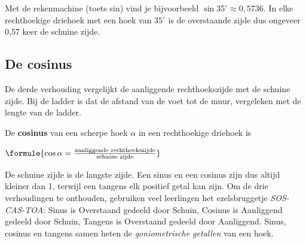 Met de rekenmachine (toets \textsf{sin}) vind je bijvoorbeeld $\sin 35^\circ \approx 0{,}5736$. In elke rechthoekige driehoek met een hoek van $35^\circ$ is de overstaande zijde dus ongeveer 0,57 keer de schuine zijde.

\subsection{De cosinus}

De derde verhouding vergelijkt de aanliggende rechthoekszijde met de schuine zijde. Bij de ladder is dat de afstand van de voet tot de muur, vergeleken met de lengte van de ladder.

\begin{theorie}
De \textbf{\textcolor{accent}{cosinus}} van een scherpe hoek $\alpha$ in een rechthoekige driehoek is

\vspace{1mm}
\qquad $\formule{\cos\alpha = \frac{\text{aanliggende rechthoekszijde}}{\text{schuine zijde}}}$
\end{theorie}


De schuine zijde is de langste zijde. Een sinus en een cosinus zijn dus altijd kleiner dan 1, terwijl een tangens elk positief getal kan zijn. Om de drie verhoudingen te onthouden, gebruiken veel leerlingen het ezelsbruggetje \textit{SOS-CAS-TOA}: Sinus is Overstaand gedeeld door Schuin, Cosinus is Aanliggend gedeeld door Schuin, Tangens is Overstaand gedeeld door Aanliggend. Sinus, cosinus en tangens samen heten de \emph{goniometrische getallen} van een hoek.

